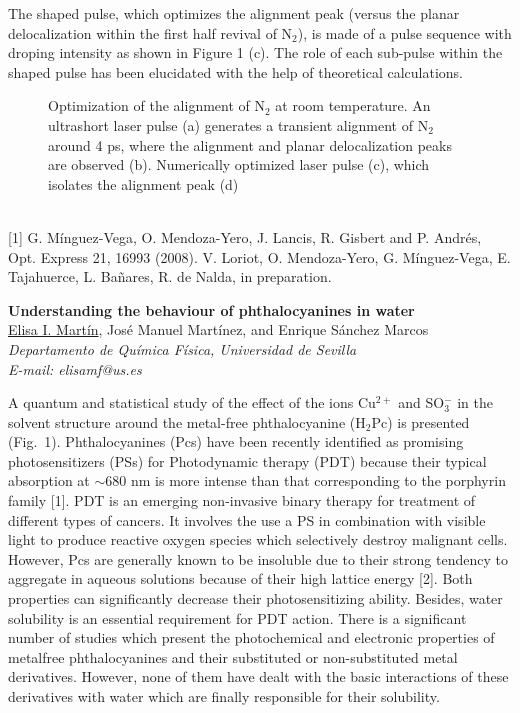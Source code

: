 The shaped pulse, which optimizes the alignment peak (versus the planar
delocalization within the first half revival of N$_{2}$), is made of a pulse sequence with
droping intensity as shown in Figure 1 (c). The role of each sub-pulse within the
shaped pulse has been elucidated with the help of theoretical calculations.
\\
\begin{figure}[h]
 \centerline{}
 \caption[]{Optimization of the alignment of N$_{2}$ at room temperature. An ultrashort laser pulse (a) generates a transient alignment of N$_{2}$ around 4 ps, where the alignment and planar delocalization peaks are observed (b). Numerically optimized laser pulse (c), which isolates the alignment peak (d)}\label{figure 1}
\end{figure}
\\
{\footnotesize
[1] G. Mínguez-Vega, O. Mendoza-Yero, J. Lancis, R. Gisbert and P. Andrés, Opt. Express 21, 16993
(2008).
\newline
[2] V. Loriot, O. Mendoza-Yero, G. Mínguez-Vega, E. Tajahuerce, L. Bañares, R. de Nalda, in
preparation.
}
\newpage
\setcounter{figure}{0}
\begin{center}
{\bf \Large
Understanding the behaviour of phthalocyanines in water
}
\\
\vspace{0.5cm}
\underline{Elisa I. Martín}, José Manuel Martínez, and Enrique Sánchez Marcos
\\
\vspace{0.5cm}
{\it 
Departamento de Química Física, Universidad de Sevilla
}
\\
\vspace{0.5cm}
{\it E-mail: elisamf@us.es}
\\
\vspace{0.5cm}
\end{center}
A quantum and statistical study of the effect of the ions Cu$^{2+}$ and SO$_{3}^{-}$ in the solvent
structure around the metal-free phthalocyanine (H$_{2}$Pc) is presented (Fig.~1).
Phthalocyanines (Pcs) have been recently identified as promising photosensitizers (PSs) for
Photodynamic therapy (PDT) because their typical absorption at $\sim$680 nm is more intense than
that corresponding to the porphyrin family [1]. PDT is an emerging non-invasive binary therapy
for treatment of different types of cancers. It involves the use a PS in combination with visible
light to produce reactive oxygen species which selectively destroy malignant cells. However, Pcs
are generally known to be insoluble due to their strong tendency to aggregate in aqueous solutions
because of their high lattice energy [2]. Both properties can significantly decrease their photosensitizing ability.
Besides, water solubility is an essential requirement for PDT action. There is a
significant number of studies which present the photochemical and electronic properties of metalfree phthalocyanines
and their substituted or non-substituted metal derivatives. However, none
of them have dealt with the basic interactions of these derivatives with water which are finally
responsible for their solubility.

